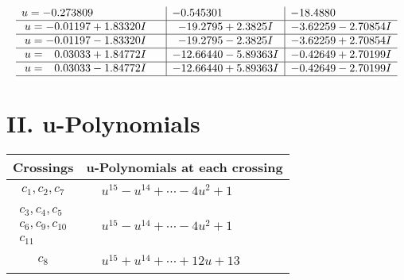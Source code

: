 \documentclass[1p]{elsarticle_modified}
\theoremstyle{definition}
\begin{document}
$$\begin{array}{c|c|c}
\begin{aligned}
u &= -0.273809\phantom{ +0.000000I}\end{aligned}
 & -0.545301\phantom{ +0.000000I} & -18.4880\phantom{ +0.000000I} \\ \hline\begin{aligned}
u &= -0.01197 + 1.83320 I\end{aligned}
 & -19.2795 + 2.3825 I & -3.62259 - 2.70854 I \\ \hline\begin{aligned}
u &= -0.01197 - 1.83320 I\end{aligned}
 & -19.2795 - 2.3825 I & -3.62259 + 2.70854 I \\ \hline\begin{aligned}
u &= \phantom{-}0.03033 + 1.84772 I\end{aligned}
 & -12.66440 - 5.89363 I & -0.42649 + 2.70199 I \\ \hline\begin{aligned}
u &= \phantom{-}0.03033 - 1.84772 I\end{aligned}
 & -12.66440 + 5.89363 I & -0.42649 - 2.70199 I\\
 \hline 
 \end{array}$$\newpage
\newpage\renewcommand{\arraystretch}{1}
\centering \section*{ II. u-Polynomials}
\begin{tabular}{m{50pt}|m{274pt}}
Crossings & \hspace{64pt}u-Polynomials at each crossing \\
\hline $$\begin{aligned}c_{1},c_{2},c_{7}\end{aligned}$$&$\begin{aligned}
&u^{15}- u^{14}+\cdots-4 u^2+1
\end{aligned}$\\
\hline $$\begin{aligned}c_{3},c_{4},c_{5}\\c_{6},c_{9},c_{10}\\c_{11}\end{aligned}$$&$\begin{aligned}
&u^{15}- u^{14}+\cdots-4 u^2+1
\end{aligned}$\\
\hline $$\begin{aligned}c_{8}\end{aligned}$$&$\begin{aligned}
&u^{15}+u^{14}+\cdots+12 u+13
\end{aligned}$\\
\hline
\end{tabular}\newpage\renewcommand{\arraystretch}{1}
\end{document}

